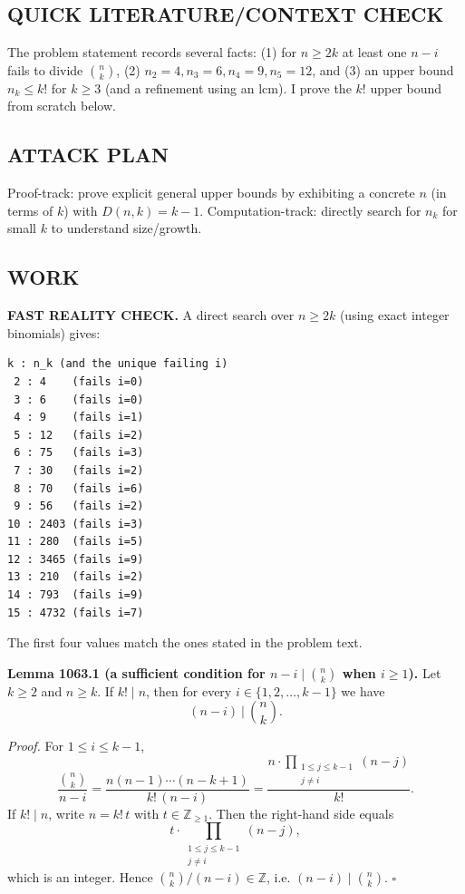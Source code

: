 \subsection*{QUICK LITERATURE/CONTEXT CHECK}
The problem statement records several facts: (1) for $n\ge 2k$ at least one $n-i$ fails to divide $\binom{n}{k}$, (2) $n_2=4,n_3=6,n_4=9,n_5=12$, and (3) an upper bound $n_k\le k!$ for $k\ge 3$ (and a refinement using an lcm). I prove the $k!$ upper bound from scratch below.

\subsection*{ATTACK PLAN}
Proof-track: prove explicit general upper bounds by exhibiting a concrete $n$ (in terms of $k$) with $D(n,k)=k-1$.
Computation-track: directly search for $n_k$ for small $k$ to understand size/growth.

\subsection*{WORK}
\textbf{FAST REALITY CHECK.}
A direct search over $n\ge 2k$ (using exact integer binomials) gives:
\begin{verbatim}
k : n_k (and the unique failing i)
 2 : 4    (fails i=0)
 3 : 6    (fails i=0)
 4 : 9    (fails i=1)
 5 : 12   (fails i=2)
 6 : 75   (fails i=3)
 7 : 30   (fails i=2)
 8 : 70   (fails i=6)
 9 : 56   (fails i=2)
10 : 2403 (fails i=3)
11 : 280  (fails i=5)
12 : 3465 (fails i=9)
13 : 210  (fails i=2)
14 : 793  (fails i=9)
15 : 4732 (fails i=7)
\end{verbatim}
The first four values match the ones stated in the problem text.

\medskip
\textbf{Lemma 1063.1 (a sufficient condition for $n-i\mid \binom{n}{k}$ when $i\ge 1$).}
Let $k\ge 2$ and $n\ge k$. If $k!\mid n$, then for every $i\in\{1,2,\dots,k-1\}$ we have
\[
(n-i)\ \Big|\ \binom{n}{k}.
\]

\emph{Proof.}
For $1\le i\le k-1$,
\[
\frac{\binom{n}{k}}{n-i} = \frac{n(n-1)\cdots(n-k+1)}{k!\,(n-i)} = \frac{n\cdot\prod_{\substack{1\le j\le k-1\\ j\ne i}} (n-j)}{k!}.
\]
If $k!\mid n$, write $n=k!\,t$ with $t\in\mathbb Z_{\ge 1}$. Then the right-hand side equals
\[
 t\cdot\prod_{\substack{1\le j\le k-1\\ j\ne i}} (n-j),
\]
which is an integer. Hence $\binom{n}{k}/(n-i)\in\mathbb Z$, i.e. $(n-i)\mid \binom{n}{k}$. \hfill$\square$


